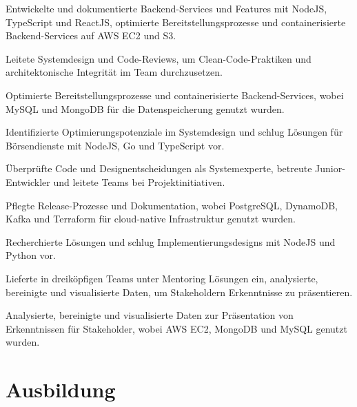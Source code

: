 \documentclass[11pt,a4paper]{resume}
\begin{document}
\bullets
  \item Entwickelte und dokumentierte Backend-Services und Features mit NodeJS, TypeScript und ReactJS, optimierte Bereitstellungsprozesse und containerisierte Backend-Services auf AWS EC2 und S3.
  \item Leitete Systemdesign und Code-Reviews, um Clean-Code-Praktiken und architektonische Integrität im Team durchzusetzen.
  \item Optimierte Bereitstellungsprozesse und containerisierte Backend-Services, wobei MySQL und MongoDB für die Datenspeicherung genutzt wurden.
\bulletsend
\vspace{3pt}
\bullets
  \item Identifizierte Optimierungspotenziale im Systemdesign und schlug Lösungen für Börsendienste mit NodeJS, Go und TypeScript vor.
  \item Überprüfte Code und Designentscheidungen als Systemexperte, betreute Junior-Entwickler und leitete Teams bei Projektinitiativen.
  \item Pflegte Release-Prozesse und Dokumentation, wobei PostgreSQL, DynamoDB, Kafka und Terraform für cloud-native Infrastruktur genutzt wurden.
\bulletsend
\vspace{3pt}
\bullets
  \item Recherchierte Lösungen und schlug Implementierungsdesigns mit NodeJS und Python vor.
  \item Lieferte in dreiköpfigen Teams unter Mentoring Lösungen ein, analysierte, bereinigte und visualisierte Daten, um Stakeholdern Erkenntnisse zu präsentieren.
  \item Analysierte, bereinigte und visualisierte Daten zur Präsentation von Erkenntnissen für Stakeholder, wobei AWS EC2, MongoDB und MySQL genutzt wurden.
\bulletsend
\vspace{3pt}

\section{Ausbildung}

\vspace{2pt}
\end{document}
